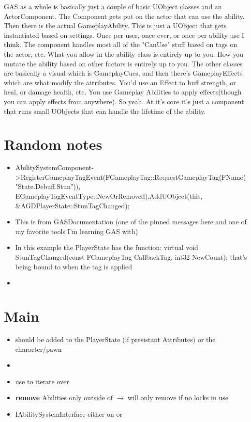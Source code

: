     GAS as a whole is basically just a couple of basic UObject classes and an ActorComponent.
    The Component gets put on the actor that can use the ability. Then there is the actual
    GameplayAbility. This is just a UObject that gets instantiated based on settings. Once per
    user, once ever, or once per ability use I think. The component handles most all of the 
    "CanUse" stuff based on tags on the actor, etc. What you allow in the ability class is 
    entirely up to you. How you mutate the ability based on other factors is entirely up to 
    you. The other classes are basically a visual which is GameplayCues, and then there's 
    GameplayEffects which are what modify the attributes. You'd use an Effect to buff strength, 
    or heal, or damage health, etc. You use Gameplay Abilities to apply effects(though you can 
    apply effects from anywhere). So yeah. At it's core it's just a component that runs small 
    UObjects that can handle the lifetime of the ability.


    \section{Random notes}
    \begin{itemize}
        \item AbilitySystemComponent->RegisterGameplayTagEvent(FGameplayTag::RequestGameplayTag(FName("State.Debuff.Stun")), EGameplayTagEventType::NewOrRemoved).AddUObject(this, \&AGDPlayerState::StunTagChanged);
        \item This is from GASDocumentation (one of the pinned messages here and one of my favorite tools I'm learning GAS with)
        \item In this example the PlayerState has the function: virtual void StunTagChanged(const FGameplayTag CallbackTag, int32 NewCount); that's being bound to when the tag is applied

        \item 
    \end{itemize}
    
    \section{Main}
        \begin{itemize}
            \item should be added to the PlayerState (if presistant Attributes) or the character/pawn
            
            \item {}
            \item use  to iterate over 
            \item \textbf{remove} Abilities only outside of  $\rightarrow$ will only remove if no locks in use
            
            \item IAbilitySystemInterface either on  or 
        \end{itemize}

